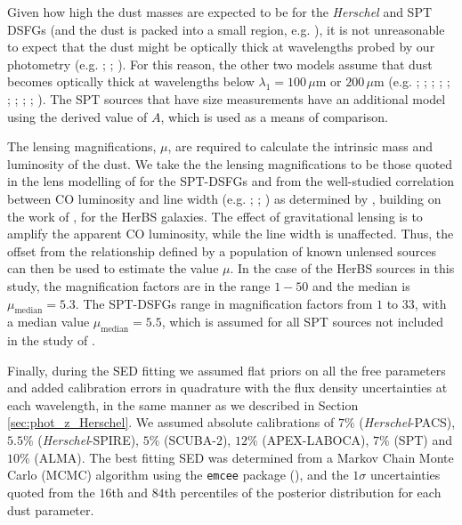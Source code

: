 Given how high the dust masses are expected to be for the \textit{Herschel} and SPT DSFGs (and the dust is packed into a small region, e.g. \citealt{Ikarashi_2017}), it is not unreasonable to expect that the dust might be optically thick at wavelengths probed by our photometry (e.g. \citealt{Conley_2011}; \citealt{Casey_2019}; \citealt{Cortzen_2020}). For this reason, the other two models assume that dust becomes optically thick at wavelengths below $\lambda_1 = 100\,\mu$m or $200\,\mu$m (e.g. \citealt{Blain_2003}; \citealt{Draine_2006}; \citealt{Conley_2011}; \citealt{Rangwala_2011}; \citealt{Greve_2012}; \citealt{Casey_2014a}; \citealt{Spilker_2016}; \citealt{Casey_2019}; \citealt{Cooper_2022}; \citealt{Drew_2022}). The SPT sources that have size measurements have an additional model using the derived value of $A$, which is used as a means of comparison.

The lensing magnifications, $\mu$, are required to calculate the intrinsic mass and luminosity of the dust. We take the the lensing magnifications to be those quoted in the lens modelling of \citealt{Spilker_2016} for the SPT-DSFGs and from the well-studied correlation between CO luminosity and line width (e.g. \citealt{Bothwell_2013}; \citealt{Dannerbauer_2017}; \citealt{Neri_2020}) as determined by \citealt{Urquhart_2022}, building on the work of \citealt{Harris_2012}, for the HerBS galaxies. The effect of gravitational lensing is to amplify the apparent CO luminosity, while the line width is unaffected. Thus, the offset from the relationship defined by a population of known unlensed sources can then be used to estimate the value $\mu$. In the case of the HerBS sources in this study, the magnification factors are in the range $1 - 50$ and the median is $\mu_{\textrm{median}} = 5.3$. The SPT-DSFGs range in magnification factors from $1$ to $33$, with a median value $\mu_{\textrm{median}} = 5.5$, which is assumed for all SPT sources not included in the study of \citealt{Spilker_2016}. 

Finally, during the SED fitting we assumed flat priors on all the free parameters and added calibration errors in quadrature with the flux density uncertainties at each wavelength, in the same manner as we described in Section \ref{sec:phot_z_Herschel}. We assumed absolute calibrations of $7\%$ (\textit{Herschel}-PACS), $5.5\%$ (\textit{Herschel}-SPIRE), $5\%$ (SCUBA-2), $12\%$ (APEX-LABOCA), $7\%$ (SPT) and $10\%$ (ALMA). The best fitting SED was determined from a Markov Chain Monte Carlo (MCMC) algorithm using the \texttt{emcee} package (\citealt{Foreman-Mackey_2013}), and the $1\sigma$ uncertainties quoted from the $16$th and $84$th percentiles of the posterior distribution for each dust parameter.

